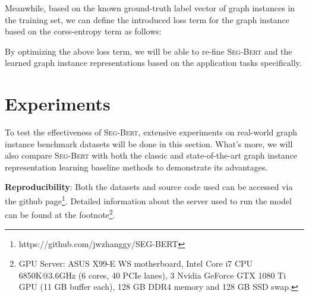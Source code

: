 \documentclass{article}
\newcommand{\our}{\textsc{Seg-Bert}}
\begin{document}
Meanwhile, based on the known ground-truth label vector of graph instances in the training set, we can define the introduced loss term for the graph instance based on the corss-entropy term as follows:




By optimizing the above loss term, we will be able to re-fine {\our} and the learned graph instance representations based on the application tasks specifically.










\section{Experiments}\label{sec:experiment}

To test the effectiveness of {\our}, extensive experiments on real-world graph instance benchmark datasets will be done in this section. What's more, we will also compare {\our} with both the classic and state-of-the-art graph instance representation learning baseline methods to demonstrate its advantages. 

\noindent \textbf{Reproducibility}: Both the datasets and source code used can be accessed via the github page\footnote{https://github.com/jwzhanggy/SEG-BERT}. Detailed information about the server used to run the model can be found at the footnote\footnote{GPU Server: ASUS X99-E WS motherboard, Intel Core i7 CPU 6850K@3.6GHz (6 cores, 40 PCIe lanes), 3 Nvidia GeForce GTX 1080 Ti GPU (11 GB buffer each), 128 GB DDR4 memory and 128 GB SSD swap.}.
\end{document}
